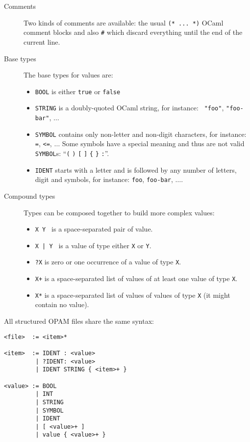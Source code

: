 \documentclass[a4paper,11pt]{article}
\begin{document}
\begin{description}

\item[Comments] Two kinds of comments are available: the usual
  \verb+(* ... *)+ OCaml comment blocks and also \verb+#+ which
  discard everything until the end of the current line.

\item[Base types] The base types for values are:

\begin{itemize}
\item {\tt BOOL} is  either {\tt true} or {\tt false}
\item {\tt STRING} is a doubly-quoted OCaml string, for instance: {\tt
  "foo"}, {\tt "foo-bar"}, $\ldots$
\item {\tt SYMBOL} contains only non-letter and non-digit characters,
  for instance: {\tt =}, {\tt <=}, $\ldots$ Some symbols have a special
  meaning and thus are not valid {\tt SYMBOL}s: ``\verb+(+ \verb+)+
  \verb+[+ \verb+]+ \verb+{+ \verb+}+ \verb+:+''.
\item {\tt IDENT} starts with a letter and is followed by any number of
  letters, digit and symbols, for instance: {\tt foo}, {\tt foo-bar},
  $\ldots$.
\end{itemize}


\item[Compound types] Types can be composed together to build more
  complex values:

\begin{itemize}
\item {\tt X Y } is a space-separated pair of value.
\item {\tt X | Y } is a value of type either {\tt X} or {\tt Y}.
\item {\tt ?X} is zero or one occurrence of a value of type {\tt X}.
\item {\tt X+} is a space-separated list of values of at least one value
  of type {\tt X}.
\item {\tt X*} is a space-separated list of values of values of type
  {\tt X} (it might contain no value).
\end{itemize}

\end{description}

All structured OPAM files share the same syntax:

{\small
\begin{Verbatim}[frame=single]
<file>  := <item>*

<item>  := IDENT : <value>
         | ?IDENT: <value>
         | IDENT STRING { <item>+ }

<value> := BOOL
         | INT
         | STRING
         | SYMBOL
         | IDENT
         | [ <value>+ ]
         | value { <value>+ }
\end{Verbatim}
}
\end{document}
